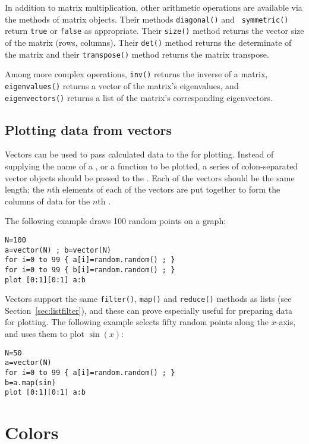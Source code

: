 In addition to matrix multiplication, other arithmetic operations are available
via the methods of matrix objects. Their methods {\tt diagonal()} and {\tt
symmetric()} return {\tt true} or {\tt false} as appropriate. Their {\tt size()}
method returns the vector size of the matrix (rows, columns). Their {\tt det()}
method returns the determinate of the matrix and their {\tt transpose()} method
returns the matrix transpose.

Among more complex operations, {\tt inv()} returns the inverse of a matrix,
{\tt eigen\-values()} returns a vector of the matrix's eigen\-values, and {\tt
eigen\-vectors()} returns a list of the matrix's corresponding eigen\-vectors.

\subsection{Plotting data from vectors}

Vectors can be used to pass calculated data to the  for plotting.
Instead of supplying the name of a \datafile, or a function to be plotted, a
series of colon-separated vector objects should be passed to the
. Each of the vectors should be the same length; the $n$th
elements of each of the vectors are put together to form the columns of data
for the $n$th \datapoint.

The following example draws 100 random points on a graph:

\begin{verbatim}
N=100
a=vector(N) ; b=vector(N)
for i=0 to 99 { a[i]=random.random() ; }
for i=0 to 99 { b[i]=random.random() ; }
plot [0:1][0:1] a:b
\end{verbatim}

Vectors support the same {\tt filter()}, {\tt map()} and {\tt reduce()} methods
as lists (see Section~\ref{sec:listfilter}), and these can prove especially
useful for preparing data for plotting. The following example selects fifty
random points along the $x$-axis, and uses them to plot $\sin(x)$:

\begin{verbatim}
N=50
a=vector(N)
for i=0 to 99 { a[i]=random.random() ; }
b=a.map(sin)
plot [0:1][0:1] a:b
\end{verbatim}

\section{Colors}

